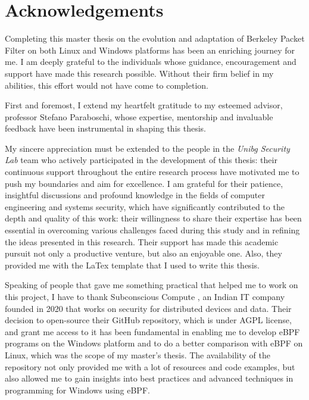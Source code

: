 \section*{Acknowledgements}

Completing this master thesis on the evolution and adaptation of Berkeley Packet Filter on both Linux and Windows platforms has been an enriching journey for me. 
I am deeply grateful to the individuals whose guidance, encouragement and support have made this research possible. 
Without their firm belief in my abilities, this effort would not have come to completion.

First and foremost, I extend my heartfelt gratitude to my esteemed advisor, professor Stefano Paraboschi, whose expertise, mentorship and invaluable feedback have been instrumental in shaping this thesis. 

My sincere appreciation must be extended to the people in the \textit{Unibg Security Lab} \cite{UnibgSeclabWebsite} team who actively participated in the development of this thesis: their continuous support throughout the entire research process have motivated me to push my boundaries and aim for excellence. 
I am grateful for their patience, insightful discussions and profound knowledge in the fields of computer engineering and systems security, which have significantly contributed to the depth and quality of this work: their willingness to share their expertise has been essential in overcoming various challenges faced during this study and in refining the ideas presented in this research.
Their support has made this academic pursuit not only a productive venture, but also an enjoyable one.
Also, they provided me with the LaTex template that I used to write this thesis.

Speaking of people that gave me something practical that helped me to work on this project, I have to thank Subconscious Compute \cite{SubComWebsite}, an Indian IT company founded in 2020 that works on security for distributed devices and data.
Their decision to open-source their GitHub repository, which is under AGPL license, and grant me access to it has been fundamental in enabling me to develop eBPF programs on the Windows platform and to do a better comparison with eBPF on Linux, which was the scope of my master's thesis.
The availability of the repository not only provided me with a lot of resources and code examples, but also allowed me to gain insights into best practices and advanced techniques in programming for Windows using eBPF. 

